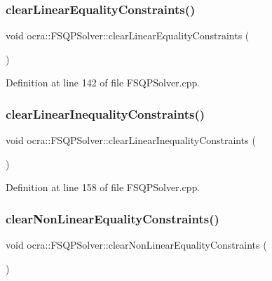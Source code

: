 \subsubsection{\texorpdfstring{clear\+Linear\+Equality\+Constraints()}{clearLinearEqualityConstraints()}}
{\footnotesize\ttfamily void ocra\+::\+F\+S\+Q\+P\+Solver\+::clear\+Linear\+Equality\+Constraints (\begin{DoxyParamCaption}{ }\end{DoxyParamCaption})}



Definition at line 142 of file F\+S\+Q\+P\+Solver.\+cpp.

\hypertarget{classocra_1_1FSQPSolver_a9658de4e998f7d3a5a65cad0288de4c3}{}\label{classocra_1_1FSQPSolver_a9658de4e998f7d3a5a65cad0288de4c3} 
\subsubsection{\texorpdfstring{clear\+Linear\+Inequality\+Constraints()}{clearLinearInequalityConstraints()}}
{\footnotesize\ttfamily void ocra\+::\+F\+S\+Q\+P\+Solver\+::clear\+Linear\+Inequality\+Constraints (\begin{DoxyParamCaption}{ }\end{DoxyParamCaption})}



Definition at line 158 of file F\+S\+Q\+P\+Solver.\+cpp.

\hypertarget{classocra_1_1FSQPSolver_a9220b29b0887196a700b38b95d7c67e9}{}\label{classocra_1_1FSQPSolver_a9220b29b0887196a700b38b95d7c67e9} 
\subsubsection{\texorpdfstring{clear\+Non\+Linear\+Equality\+Constraints()}{clearNonLinearEqualityConstraints()}}
{\footnotesize\ttfamily void ocra\+::\+F\+S\+Q\+P\+Solver\+::clear\+Non\+Linear\+Equality\+Constraints (\begin{DoxyParamCaption}{ }\end{DoxyParamCaption})}



